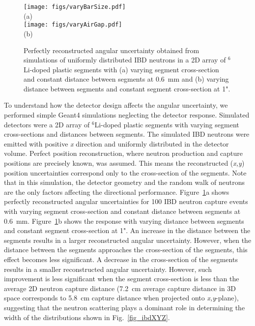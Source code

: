 \documentclass[final,5p,times,twocolumn]{elsarticle}
\begin{document}
\begin{figure}[ht]
\centering\texttt{[image: figs/varyBarSize.pdf]}\\
(a)\\
\centering\texttt{[image: figs/varyAirGap.pdf]}\\
(b)
\caption{Perfectly reconstructed angular uncertainty obtained from simulations of uniformly distributed IBD neutrons in a 2D array of $^6$Li-doped plastic segments with (a) varying segment cross-section and constant distance between segments at 0.6~mm and (b) varying distance between segments and constant segment cross-section at 1".}
\label{fig_toyMC}
\end{figure}

To understand how the detector design affects the angular uncertainty, we performed simple Geant4 simulations neglecting the detector response. Simulated detectors were a 2D array of $^6$Li-doped plastic segments with varying segment cross-sections and distances between segments. The simulated IBD neutrons were emitted with positive \textit{x} direction and uniformly distributed in the detector volume. Perfect position reconstruction, where neutron production and capture positions are precisely known, was assumed. This means the reconstructed (\textit{x,y}) position uncertainties correspond only to the cross-section of the segments. 
Note that in this simulation, the detector geometry and the random walk of neutrons are the only factors affecting the directional performance.
Figure~\ref{fig_toyMC}a shows perfectly reconstructed angular uncertainties for 100 IBD neutron capture events with varying segment cross-section and constant distance between segments at 0.6~mm. 
Figure~\ref{fig_toyMC}b shows the response with varying distance between segments and constant segment cross-section at 1". 
An increase in the distance between the segments results in a larger reconstructed angular uncertainty. However, when the distance between the segments approaches the cross-section of the segments, this effect becomes less significant.
A decrease in the cross-section of the segments results in a smaller reconstructed angular uncertainty. However, such improvement is less significant when the segment cross-section is less than the average 2D neutron capture distance (7.2~cm average capture distance in 3D space corresponds to 5.8~cm capture distance when projected onto \textit{x,y}-plane), suggesting that the neutron scattering plays a dominant role in determining the width of the distributions shown in Fig.~\ref{fig_ibdXYZ}.    
\end{document}

